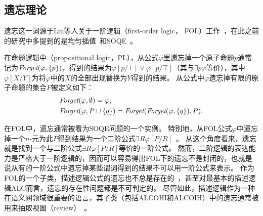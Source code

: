 \subsection{遗忘理论}\label{chapter01:forgetting}
遗忘这一词源于Lin等人关于一阶逻辑（first-order logic， FOL）工作~\cite{lin1994forget}，在此之前的研究中多提到的是均匀插值~\cite{visser1996uniform,konev2009forgetting}和SOQE~\cite{ackermann1935untersuchungen}。

在命题逻辑中（propositional logic，PL），从公式$\varphi$里遗忘掉一个原子命题$p$通常记为$\textit{Forget}(\varphi,\{p\})$，得到的结果为$\varphi[p/\bot] \vee \varphi[p/\top]$（其与$\exists p\varphi$等价），其中$\varphi[X/Y]$为将$\varphi$中的$X$的全部出现替换为$Y$得到的结果。
从公式中$\varphi$遗忘掉有限的原子命题的集合$P$被定义如下：
\begin{alignat*}{2}
	&  \Forget(\varphi, \emptyset) = \varphi, \qquad \\ %
	&  \Forget(\varphi, P \cup \{q\})  = \Forget(\Forget(\varphi, \{q\}), P).
	\nonumber
\end{alignat*}

在FOL中，遗忘通常被看为SOQE问题的一个实例。
特别地，从FOL公式$\varphi$中遗忘掉一个$n$-元为此$P$得到结果为一个二阶公式$\exists R \varphi[P/R]$~\cite{lin1994forget}。
从这个角度看来，遗忘就是找到一个与二阶公式$\exists R \varphi[P/R]$等价的一阶公式。
然而，二阶逻辑的表达能力是严格大于一阶逻辑的，因而可以容易得出FOL下的遗忘不是封闭的，也就是说从有的一阶公式中遗忘掉某些谓词得到的结果不可以用一阶公式来表示。
作为FOL的一个子类，描述逻辑公式的遗忘也不总是存在的~\cite{DBLP:journals/ai/KonevL0W13}，甚至对最基本的描述逻辑{\cal ALC}而言，遗忘的存在性问题都是不可判定的。
尽管如此，描述逻辑作为一种在语义网领域很重要的语言，其子类（包括{\cal ALCOHI}和{\cal ALCOIH}）中的遗忘通常被用来抽取视图（review）~\cite{Wang:AMAI:2010,DBLP:conf/ijcai/LutzW11,Konev:JAIR:2012,DBLP:conf/ijcai/ZhaoS17,DBLP:conf/aaai/ZhaoSWZF20}。

